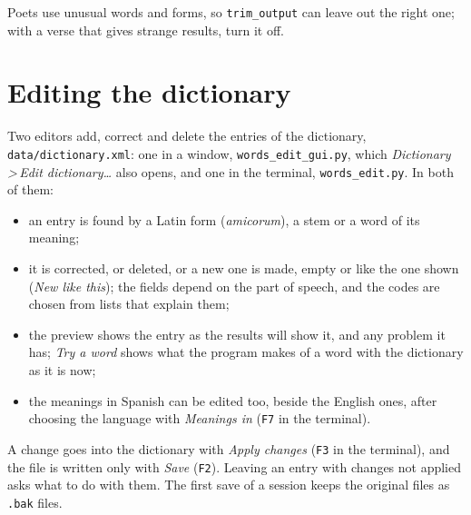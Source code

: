 \documentclass[12pt,
              article,
              oneside
              ]{memoir}
\newcommand*{\menu}[1]{\textit{#1}}
\newcommand*{\then}{\,>\,}
\newcommand*{\key}[1]{\texttt{#1}}
\begin{document}
\noindent{}%
Poets use unusual words and forms, so \texttt{trim\_output} can leave out
the right one; with a verse that gives strange results, turn it off.

\section{Editing the dictionary}
\label{sec:editing}

%
Two editors add, correct and delete the entries of the dictionary,
\texttt{data/dictionary.xml}: one in a window, \texttt{words\_edit\_gui.py},
which \menu{Dictionary\then Edit dictionary\ldots} also opens, and one in
the terminal, \texttt{words\_edit.py}. In both of them:

\begin{itemize}
\item an entry is found by a Latin form (\textit{amicorum}), a stem or a
  word of its meaning;
\item it is corrected, or deleted, or a new one is made, empty or like
  the one shown (\menu{New like this}); the fields depend on the part of
  speech, and the codes are chosen from lists that explain them;
\item the preview shows the entry as the results will show it, and any
  problem it has; \menu{Try a word} shows what the program makes of a word
  with the dictionary as it is now;
\item the meanings in Spanish can be edited too, beside the English ones,
  after choosing the language with \menu{Meanings in} (\key{F7} in the
  terminal).
\end{itemize}

%
A change goes into the dictionary with \menu{Apply changes} (\key{F3} in
the terminal), and the file is written only with \menu{Save} (\key{F2}).
Leaving an entry with changes not applied asks what to do with them. The
first save of a session keeps the original files as \texttt{.bak} files.
\end{document}
